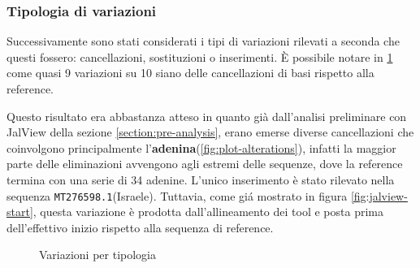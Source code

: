 \documentclass[11pt,italian]{article}
\begin{document}
\subsubsection*{Tipologia di variazioni}
Successivamente sono stati considerati i tipi di variazioni rilevati a seconda che questi fossero: cancellazioni, sostituzioni o inserimenti. È possibile notare in \cref{fig:plot-variations-per-type} come quasi 9 variazioni su 10 siano delle cancellazioni di basi rispetto alla reference.

Questo risultato era abbastanza atteso in quanto già dall'analisi preliminare con JalView della sezione \ref{section:pre-analysis}, erano emerse diverse cancellazioni che coinvolgono principalmente l'\textbf{adenina}(\cref{fig:plot-alterations}), infatti la maggior parte delle eliminazioni avvengono agli estremi delle sequenze, dove la reference termina con una serie di 34 adenine.
L'unico inserimento è stato rilevato nella sequenza \lstinline{MT276598.1}(Israele). Tuttavia, come giá mostrato in figura \cref{fig:jalview-start}, questa variazione è prodotta dall'allineamento dei tool e posta prima dell'effettivo inizio rispetto alla sequenza di reference.
\begin{figure}[H]
  \caption{Variazioni per tipologia}
  \label{fig:plot-variations-per-type}
\end{figure}
\end{document}
